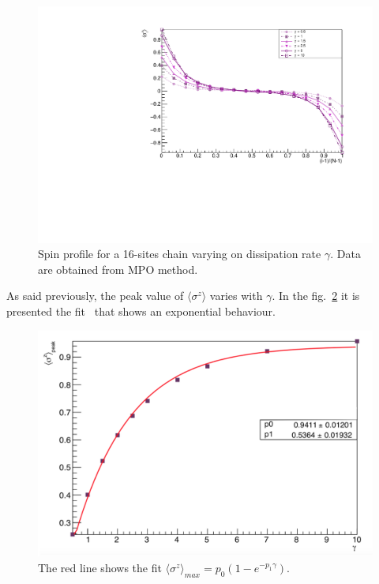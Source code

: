 \begin{figure}[H]
    \centering
    \includegraphics[scale=0.7]{Figures/16sites/16sites_LMvsGamma.pdf}
    \caption{Spin profile for a 16-sites chain varying on dissipation rate $\gamma$. Data are obtained from MPO method.}
    \label{fig:16sites_LMvsGamma}
\end{figure}

As said previously, the peak value of $\langle\sigma^z\rangle$ varies with $\gamma$. In the fig.~\ref{fig:FIT_PeakLMvsGamma_J1051} it is presented the fit~\cite{root_cern} that shows an exponential behaviour. 

\begin{figure}[H]
    \centering
    \includegraphics[scale=0.5]{Figures/FIT_PeakLMVsGamma.png}
    \caption{The red line shows the fit $\langle\sigma^z\rangle_{max} = p_0(1-e^{-p_1\gamma})$.}
    \label{fig:FIT_PeakLMvsGamma_J1051}
\end{figure}

